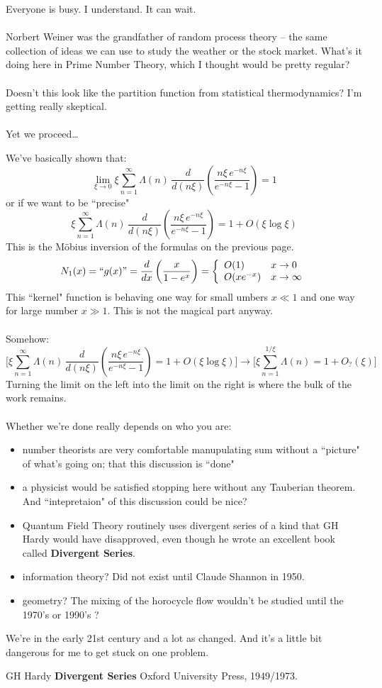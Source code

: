 \documentclass[12pt]{article}
\begin{document}
Everyone is busy.  I understand.  It can wait. \\ \\
Norbert Weiner was the grandfather of random process theory -- the same collection of ideas we can use to study the weather or the stock market.  What's it doing here in Prime Number Theory, which I thought would be pretty regular? \\ \\
Doesn't this look like the partition function from statistical thermodynamics?  I'm getting really skeptical.   \\ \\Yet we proceed\dots

\newpage

\noindent We've basically shown that:
$$ \lim_{\xi \to 0} \xi \sum_{n=1}^\infty  \Lambda(n) \, \frac{d}{d(n\xi)} \left( \frac{ n \xi \, e^{-n\xi}}{e^{-n\xi}-1} \right) = 1$$
or if we want to be ``precise"
$$ \xi \sum_{n=1}^\infty \Lambda(n) \,  \frac{d}{d(n\xi)} \left( \frac{ n \xi \, e^{-n\xi}}{e^{-n\xi}-1} \right) = 1 + O(\xi \log \xi) $$
This is the M\"{o}bius inversion of the formulas on the previous page.
$$N_1(x) = ``g(x)"  = \frac{d}{dx} \left( \frac{  x }{ 1 - e^x} \right)
= \left\{ \begin{array}{ll}
O(1) & x \to 0 \\
O(xe^{-x}) & x \to \infty
 \end{array} \right.$$
This ``kernel" function is behaving one way for small umbers $x \ll 1$ and one way for large number $x \gg 1$.  This is not the magical part anyway. \\ \\
Somehow:
$$ \Bigg[ \xi \sum_{n=1}^\infty \Lambda(n) \,  \frac{d}{d(n\xi)} \left( \frac{ n \xi \, e^{-n\xi}}{e^{-n\xi}-1} \right) = 1 + O(\xi \log \xi) \Bigg]
\to \Bigg[ \xi \sum_{n=1}^{1/\xi} \Lambda(n)  = 1 + O_?(\xi) \Bigg] $$
Turning the limit on the left into the limit on the right is where the bulk of the work remains.   \\ \\
Whether we're done really depends on who you are:
\begin{itemize}
\item number theorists are very comfortable manupulating sum without a ``picture" of what's going on; that this discussion is ``done"
\item a physicist would be satisfied stopping here without any Tauberian theorem.  And ``intepretaion" of this discussion could be nice? 
\item Quantum Field Theory routinely uses divergent series of a kind that GH Hardy would have disapproved, even though he wrote an excellent book called \textbf{Divergent Series}.
\item information theory? Did not exist until Claude Shannon in 1950.
\item geometry?  The mixing of the horocycle flow wouldn't be studied until the 1970's or 1990's ?
\end{itemize}
We're in the early 21st century and a lot as changed.  And it's a little bit dangerous for me to get stuck on one problem.

\begin{thebibliography}{}

\item GH Hardy \textbf{Divergent Series}  Oxford University Press, 1949/1973.

\end{thebibliography}

\newpage

\noindent 
\end{document}

